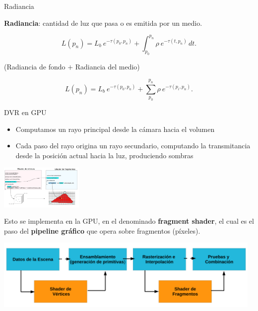 \documentclass[spanish]{beamer}
\begin{document}
\begin{frame}{Radiancia}


\textbf{Radiancia}: cantidad de luz que pasa o es emitida por un medio.

\begin{equation*}
  L(p_n) = L_b \ e^{-\tau(p_0, p_n)} + \int_{p_0}^{p_n} \rho \ e^{-\tau(t,p_n)} \, dt.
\end{equation*}

(Radiancia de fondo $+$ Radiancia del medio)


\begin{equation*}
  L(p_n) = L_b \ e^{-\tau(p_0, p_n)} + \sum_{p_0}^{p_n} \rho \ e^{-\tau(p_i,p_n)}.
\end{equation*}


\end{frame}


\begin{frame}{DVR en GPU}

\begin{itemize}
\item Computamos un rayo principal desde la cámara hacia el volumen
\item Cada paso del rayo origina un rayo secundario, computando la transmitancia desde la posición actual hacia la luz, produciendo sombras
\end{itemize}

\centerline{\includegraphics[width=4cm]{../figures/fragmentshader}}

\end{frame}

\begin{frame}
Esto se implementa en la GPU, en el denominado \textbf{fragment shader}, el cual es el paso del \textbf{pipeline gráfico} que opera sobre fragmentos (píxeles).

\centerline{\includegraphics[width=13cm]{../figures/pipelinegrafico}}
\end{frame}
\end{document}
